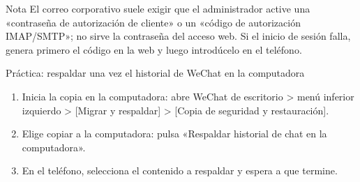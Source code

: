 \begin{tcbinfo}{Nota}
El correo corporativo suele exigir que el administrador active una «contraseña de autorización de cliente» o un «código de autorización IMAP/SMTP»; no sirve la contraseña del acceso web. Si el inicio de sesión falla, genera primero el código en la web y luego introdúcelo en el teléfono.

\end{tcbinfo}

\begin{tcbpractice}{Práctica: respaldar una vez el historial de WeChat en la computadora}
\begin{enumerate}
  \item Inicia la copia en la computadora: abre WeChat de escritorio > menú inferior izquierdo > [Migrar y respaldar] > [Copia de seguridad y restauración].
  \item Elige copiar a la computadora: pulsa «Respaldar historial de chat en la computadora».
  \item En el teléfono, selecciona el contenido a respaldar y espera a que termine.
\end{enumerate}

\end{tcbpractice}
